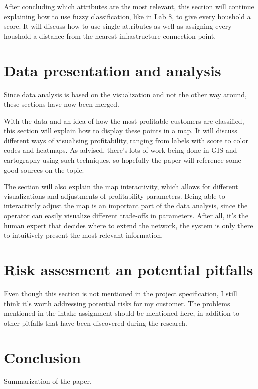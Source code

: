 \documentclass[twocolumn]{article}
\begin{document}
After concluding which attributes are the most relevant, this section will continue explaining how to use fuzzy classification, like in Lab 8, to give every houshold a score. It will discuss how to use single attributes as well as assigning every houshold a distance from the nearest infrastructure connection point. 


\section{Data presentation and analysis}
\label{sec:Data presentation and analysis}
Since data analysis is based on the visualization and not the other way around, these sections have now been merged.

With the data and an idea of how the most profitable customers are classified, this section will explain how to display these points in a map. It will discuss different ways of visualising profitability, ranging from labels with score to color codes and heatmaps. As advised, there's lots of work being done in GIS and cartography using such techniques, so hopefully the paper will reference some good sources on the topic.

The section will also explain the map interactivity, which allows for different visualizations and adjustments of profitability parameters. Being able to interactivily adjust the map is an important part of the data analysis, since the operator can easily visualize different trade-offs in parameters. After all, it's the human expert that decides where to extend the network, the system is only there to intuitively present the most relevant information.


\section{Risk assesment an potential pitfalls}
\label{sec:Risk assesment an potential pitfalls}
Even though this section is not mentioned in the project specification, I still think it's worth addressing potential risks for my customer. The problems mentioned in the intake assignment should be mentioned here, in addition to other pitfalls that have been discovered during the research.

\section{Conclusion}
\label{sec:Conclusion}
Summarization of the paper.

\printbibliography
\end{document}
